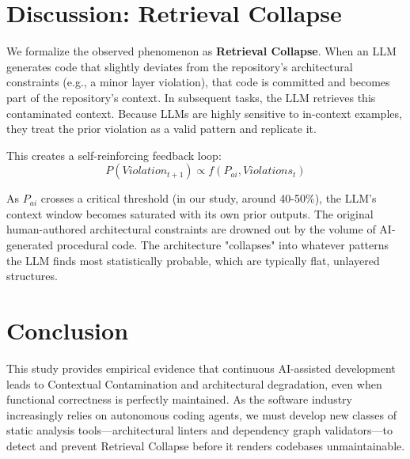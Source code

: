 \documentclass[11pt,a4paper]{article}
\begin{document}
\section{Discussion: Retrieval Collapse}
We formalize the observed phenomenon as \textbf{Retrieval Collapse}. When an LLM generates code that slightly deviates from the repository's architectural constraints (e.g., a minor layer violation), that code is committed and becomes part of the repository's context. In subsequent tasks, the LLM retrieves this contaminated context. Because LLMs are highly sensitive to in-context examples, they treat the prior violation as a valid pattern and replicate it.

This creates a self-reinforcing feedback loop:
\begin{equation}
    P(Violation_{t+1}) \propto f(P_{ai}, Violations_{t})
\end{equation}

As $P_{ai}$ crosses a critical threshold (in our study, around 40-50\%), the LLM's context window becomes saturated with its own prior outputs. The original human-authored architectural constraints are drowned out by the volume of AI-generated procedural code. The architecture "collapses" into whatever patterns the LLM finds most statistically probable, which are typically flat, unlayered structures.

\section{Conclusion}
This study provides empirical evidence that continuous AI-assisted development leads to Contextual Contamination and architectural degradation, even when functional correctness is perfectly maintained. As the software industry increasingly relies on autonomous coding agents, we must develop new classes of static analysis tools—architectural linters and dependency graph validators—to detect and prevent Retrieval Collapse before it renders codebases unmaintainable.
\end{document}
